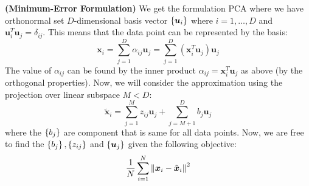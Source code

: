 \begin{definition}{\textbf{(Minimum-Error Formulation)}}
    We get the formulation PCA where we have orthonormal set $D$-dimensional basis vector $\left\{ \boldsymbol u_i \right\}$ where $i=1,\dots,D$ and $\boldsymbol u_i^T\boldsymbol u_j = \delta_{ij}$. This means that the data point can be represented by the basis:
    \begin{equation*}
        \boldsymbol x_i = \sum^D_{j=1}\alpha_{ij}\boldsymbol u_j = \sum^D_{j=1}(\boldsymbol x_i^T\boldsymbol u_j) \boldsymbol u_j 
    \end{equation*}
    The value of $\alpha_{ij}$ can be found by the inner product $\alpha_{ij} = \boldsymbol x_i^T\boldsymbol u_j$ as above (by the orthogonal properties). Now, we will consider the approximation using the projection over linear subspace $M < D$:
    \begin{equation*}
        \tilde{\boldsymbol x}_i = \sum^M_{j=1}z_{ij}\boldsymbol u_j + \sum^D_{j=M+1}b_j\boldsymbol u_j
    \end{equation*}
    where the $\left\{ b_j \right\}$  are component that is same for all data points. Now, we are free to find the $\left\{ b_j \right\}, \left\{ z_{ij} \right\}$ and $\left\{ \boldsymbol u_j \right\}$ given the following objective:
    \begin{equation*}
        \frac{1}{N}\sum^N_{i=1}\left\lVert\boldsymbol x_i - \tilde{\boldsymbol x}_i\right\rVert^2
    \end{equation*}
\end{definition}

